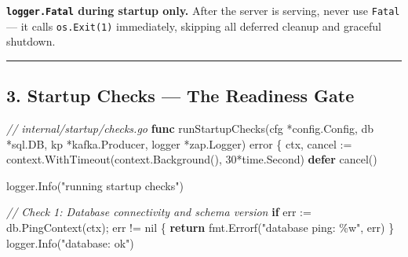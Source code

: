 \documentclass[
]{article}
\newenvironment{Shaded}{}{}
\newcommand{\CommentTok}[1]{\textcolor[rgb]{0.38,0.63,0.69}{\textit{#1}}}
\newcommand{\ControlFlowTok}[1]{\textcolor[rgb]{0.00,0.44,0.13}{\textbf{#1}}}
\newcommand{\DataTypeTok}[1]{\textcolor[rgb]{0.56,0.13,0.00}{#1}}
\newcommand{\DecValTok}[1]{\textcolor[rgb]{0.25,0.63,0.44}{#1}}
\newcommand{\KeywordTok}[1]{\textcolor[rgb]{0.00,0.44,0.13}{\textbf{#1}}}
\newcommand{\NormalTok}[1]{#1}
\newcommand{\OperatorTok}[1]{\textcolor[rgb]{0.40,0.40,0.40}{#1}}
\newcommand{\OtherTok}[1]{\textcolor[rgb]{0.00,0.44,0.13}{#1}}
\newcommand{\StringTok}[1]{\textcolor[rgb]{0.25,0.44,0.63}{#1}}
\begin{document}
\textbf{\texttt{logger.Fatal} during startup only.} After the server is
serving, never use \texttt{Fatal} --- it calls \texttt{os.Exit(1)}
immediately, skipping all deferred cleanup and graceful shutdown.

\begin{center}\rule{0.5\linewidth}{0.5pt}\end{center}

\hypertarget{startup-checks-the-readiness-gate}{%
\subsection{3. Startup Checks --- The Readiness
Gate}\label{startup-checks-the-readiness-gate}}

\begin{Shaded}
\begin{Highlighting}[]
\CommentTok{// internal/startup/checks.go}
\KeywordTok{func}\NormalTok{ runStartupChecks}\OperatorTok{(}\NormalTok{cfg }\OperatorTok{*}\NormalTok{config}\OperatorTok{.}\NormalTok{Config}\OperatorTok{,}\NormalTok{ db }\OperatorTok{*}\NormalTok{sql}\OperatorTok{.}\NormalTok{DB}\OperatorTok{,}\NormalTok{ kp }\OperatorTok{*}\NormalTok{kafka}\OperatorTok{.}\NormalTok{Producer}\OperatorTok{,}\NormalTok{ logger }\OperatorTok{*}\NormalTok{zap}\OperatorTok{.}\NormalTok{Logger}\OperatorTok{)} \DataTypeTok{error} \OperatorTok{\{}
\NormalTok{    ctx}\OperatorTok{,}\NormalTok{ cancel }\OperatorTok{:=}\NormalTok{ context}\OperatorTok{.}\NormalTok{WithTimeout}\OperatorTok{(}\NormalTok{context}\OperatorTok{.}\NormalTok{Background}\OperatorTok{(),} \DecValTok{30}\OperatorTok{*}\NormalTok{time}\OperatorTok{.}\NormalTok{Second}\OperatorTok{)}
    \ControlFlowTok{defer}\NormalTok{ cancel}\OperatorTok{()}

\NormalTok{    logger}\OperatorTok{.}\NormalTok{Info}\OperatorTok{(}\StringTok{"running startup checks"}\OperatorTok{)}

    \CommentTok{// Check 1: Database connectivity and schema version}
    \ControlFlowTok{if}\NormalTok{ err }\OperatorTok{:=}\NormalTok{ db}\OperatorTok{.}\NormalTok{PingContext}\OperatorTok{(}\NormalTok{ctx}\OperatorTok{);}\NormalTok{ err }\OperatorTok{!=} \OtherTok{nil} \OperatorTok{\{}
        \ControlFlowTok{return}\NormalTok{ fmt}\OperatorTok{.}\NormalTok{Errorf}\OperatorTok{(}\StringTok{"database ping: \%w"}\OperatorTok{,}\NormalTok{ err}\OperatorTok{)}
    \OperatorTok{\}}
\NormalTok{    logger}\OperatorTok{.}\NormalTok{Info}\OperatorTok{(}\StringTok{"database: ok"}\OperatorTok{)}


\end{Highlighting}
\end{Shaded}
\end{document}
